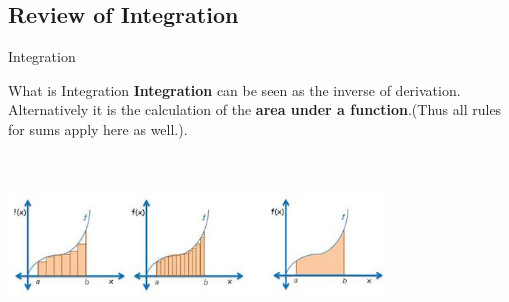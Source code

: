 \documentclass[10pt, aspectratio=1610]{beamer}
\begin{document}
\subsection{Review of Integration}
\begin{frame}{Integration}\vspace{10pt}
  \begin{block}{What is Integration}
    \textbf{Integration} can be seen as the inverse of derivation.\\
    Alternatively it is the calculation of the \textbf{area under a function}.(Thus all rules for sums apply here as well.).
  \end{block}\
  \begin{center}
    \includegraphics[height=3cm, width=10cm]{image2.png}
  \end{center}
\end{frame}
\end{document}
